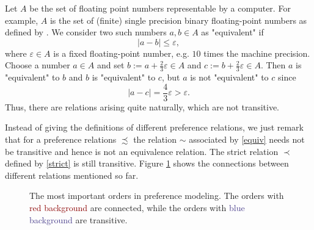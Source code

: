 ﻿\documentclass[a4paper,11pt,final]{article}
\numberwithin{equation}{subsection}
\begin{document}
\begin{exam}
Let $A$ be the set of floating point numbers representable by a computer. For example, $A$ is the set of (finite) single precision binary floating-point numbers as defined by \cite{ieee754}. We consider two such numbers $a,b\in A$ as "equivalent" if
\begin{equation*}
\bigl|a-b\bigr|\le \varepsilon,
\end{equation*}
where $\varepsilon\in A$ is a fixed floating-point number, e.g. $10$ times the machine precision. Choose a number $a\in A$ and set $b:= a + \tfrac{2}{3}\varepsilon\in A$ and $c:= b + \tfrac{2}{3}\varepsilon\in A$. Then $a$ is "equivalent" to $b$ and $b$ is "equivalent" to $c$, but $a$ is not "equivalent" to $c$ since
\begin{equation*}
\bigl|a-c\bigr|= \dfrac{4}{3}\varepsilon>\varepsilon.
\end{equation*}
Thus, there are relations arising quite naturally, which are not transitive.
\end{exam}

Instead of giving the definitions of different preference relations, we just remark that for a preference relations $\precsim$ the relation $\sim$ associated by \ref{equiv} needs not be transitive and hence is not an equivalence relation. The strict relation $\prec$ defined by \ref{strict} is still transitive. Figure \ref{fig:relations} shows the connections between different relations mentioned so far.
\begin{figure}[h!]
\centering
{}
\caption{The most important orders in preference modeling. The orders with \textcolor{DarkRed}{red background} are connected, while the orders with \textcolor{DarkSlateBlue}{blue background} are transitive.}
\label{fig:relations}
\end{figure}
\end{document}
